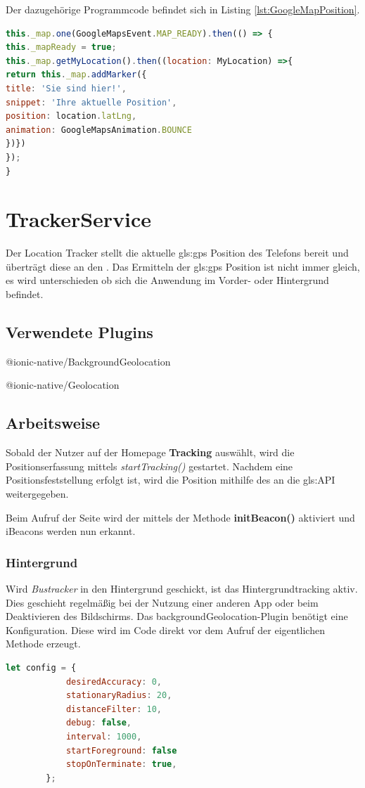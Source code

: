 Der dazugehörige Programmcode befindet sich in Listing \ref{lst:GoogleMapPosition}.


\begin{lstlisting}[float, language=JavaScript, caption=Automatische Darstellung der eigenen Position, label=lst:GoogleMapPosition]
this._map.one(GoogleMapsEvent.MAP_READY).then(() => {
this._mapReady = true;
this._map.getMyLocation().then((location: MyLocation) =>{
return this._map.addMarker({
title: 'Sie sind hier!',
snippet: 'Ihre aktuelle Position',
position: location.latLng,
animation: GoogleMapsAnimation.BOUNCE
})})
});
}
\end{lstlisting}

\section{TrackerService}
\label{srv:TrackerService}

Der Location Tracker stellt die aktuelle \gls{gls:gps} Position des Telefons bereit und überträgt diese an den . 
Das Ermitteln der \gls{gls:gps} Position ist nicht immer gleich, es wird unterschieden ob sich die Anwendung im Vorder- oder Hintergrund befindet.
\subsection{Verwendete Plugins}
@ionic-native/BackgroundGeolocation \cite{bGeolocation}

@ionic-native/Geolocation \cite{Geolocation}
\subsection{Arbeitsweise}
Sobald der Nutzer auf der Homepage \textbf{Tracking} auswählt, wird die Positionserfassung mittels \textit{startTracking()} gestartet. Nachdem eine Positionsfeststellung erfolgt ist, wird die Position mithilfe des  an die \gls{gls:API} weitergegeben. 

Beim Aufruf der Seite wird der   mittels der Methode \textbf{initBeacon()} aktiviert und iBeacons werden nun erkannt.
 
\subsubsection*{Hintergrund}

Wird \emph{Bustracker} in den Hintergrund geschickt, ist das Hintergrundtracking aktiv. Dies geschieht regelmäßig bei der Nutzung einer anderen App oder beim Deaktivieren des Bildschirms. 
Das backgroundGeolocation-Plugin benötigt eine Konfiguration. Diese wird im Code direkt vor dem Aufruf der eigentlichen Methode erzeugt.
\begin{lstlisting}[float, language=JavaScript, caption= Konfiguration Backgroundtracking, label=lst:BTConf]
 let config = {
            desiredAccuracy: 0,
            stationaryRadius: 20,
            distanceFilter: 10,
            debug: false,
            interval: 1000,
            startForeground: false
            stopOnTerminate: true,
        };
\end{lstlisting}

